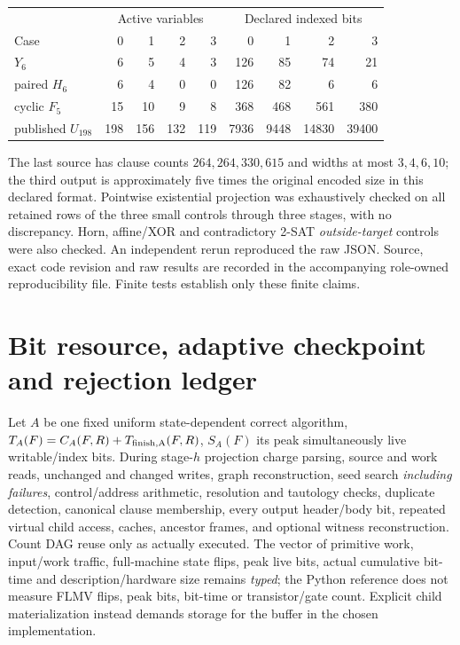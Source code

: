 \documentclass[11pt]{article}
\begin{document}
\begin{center}\begin{tabular}{lrrrrrrrr}
\toprule
&\multicolumn{4}{c}{Active variables}&\multicolumn{4}{c}{Declared indexed bits}\\
Case&0&1&2&3&0&1&2&3\\\midrule
\(Y_6\)&6&5&4&3&126&85&74&21\\
paired \(H_6\)&6&4&0&0&126&82&6&6\\
cyclic \(F_5\)&15&10&9&8&368&468&561&380\\
published \(U_{198}\)&198&156&132&119&7936&9448&14830&39400\\
\bottomrule
\end{tabular}\end{center}
The last source has clause counts \(264,264,330,615\) and widths at most \(3,4,6,10\); the third output is approximately five times the original encoded size in this declared format.  Pointwise existential projection was exhaustively checked on all retained rows of the three small controls through three stages, with no discrepancy.  Horn, affine/XOR and contradictory 2-SAT \emph{outside-target} controls were also checked. An independent rerun reproduced the raw JSON.  Source, exact code revision and raw results are recorded in the accompanying role-owned reproducibility file. Finite tests establish only these finite claims.

\section{Bit resource, adaptive checkpoint and rejection ledger}
Let \(A\) be one fixed uniform state-dependent correct algorithm, \(T_A(F)=C_A(F,R)+T_{\rm finish,A}(F,R)\), \(S_A(F)\) its peak simultaneously live writable/index bits.  During stage-\(h\) projection charge parsing, source and work reads, unchanged and changed writes, graph reconstruction, seed search \emph{including failures}, control/address arithmetic, resolution and tautology checks, duplicate detection, canonical clause membership, every output header/body bit, repeated virtual child access, caches, ancestor frames, and optional witness reconstruction.  Count DAG reuse only as actually executed.  The vector of primitive work, input/work traffic, full-machine state flips, peak live bits, actual cumulative bit-time and description/hardware size remains \emph{typed}; the Python reference does not measure FLMV flips, peak bits, bit-time or transistor/gate count.  Explicit child materialization instead demands storage for the buffer in the chosen implementation.
\end{document}
